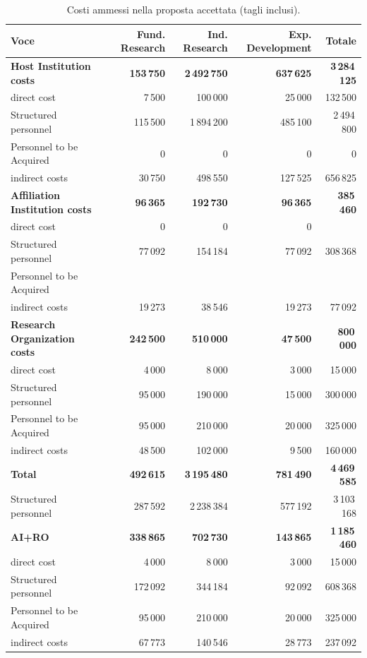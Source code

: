 \documentclass{plan4ari_report}
\begin{document}
\begin{table}[H]\centering\small
\caption{Costi ammessi nella proposta accettata (tagli inclusi).}\label{tab:acc-cost}
\begin{tabular}{lrrrr}\toprule
\textbf{Voce} & \textbf{Fund. Research} & \textbf{Ind. Research} & \textbf{Exp. Development} & \textbf{Totale} \\\midrule
\textbf{Host Institution costs} & \textbf{153\,750} & \textbf{2\,492\,750} & \textbf{637\,625} & \textbf{3\,284\,125} \\
\quad direct cost & 7\,500 & 100\,000 & 25\,000 & 132\,500 \\
\quad Structured personnel & 115\,500 & 1\,894\,200 & 485\,100 & 2\,494\,800 \\
\quad Personnel to be Acquired & 0 & 0 & 0 & 0 \\
\quad indirect costs & 30\,750 & 498\,550 & 127\,525 & 656\,825 \\
\textbf{Affiliation Institution costs} & \textbf{96\,365} & \textbf{192\,730} & \textbf{96\,365} & \textbf{385\,460} \\
\quad direct cost & 0 & 0 & 0 &  \\
\quad Structured personnel & 77\,092 & 154\,184 & 77\,092 & 308\,368 \\
\quad Personnel to be Acquired &  &  &  &  \\
\quad indirect costs & 19\,273 & 38\,546 & 19\,273 & 77\,092 \\
\textbf{Research Organization costs} & \textbf{242\,500} & \textbf{510\,000} & \textbf{47\,500} & \textbf{800\,000} \\
\quad direct cost & 4\,000 & 8\,000 & 3\,000 & 15\,000 \\
\quad Structured personnel & 95\,000 & 190\,000 & 15\,000 & 300\,000 \\
\quad Personnel to be Acquired & 95\,000 & 210\,000 & 20\,000 & 325\,000 \\
\quad indirect costs & 48\,500 & 102\,000 & 9\,500 & 160\,000 \\
\midrule
\textbf{Total} & \textbf{492\,615} & \textbf{3\,195\,480} & \textbf{781\,490} & \textbf{4\,469\,585} \\
\quad Structured personnel & 287\,592 & 2\,238\,384 & 577\,192 & 3\,103\,168 \\
\textbf{AI+RO} & \textbf{338\,865} & \textbf{702\,730} & \textbf{143\,865} & \textbf{1\,185\,460} \\
\quad direct cost & 4\,000 & 8\,000 & 3\,000 & 15\,000 \\
\quad Structured personnel & 172\,092 & 344\,184 & 92\,092 & 608\,368 \\
\quad Personnel to be Acquired & 95\,000 & 210\,000 & 20\,000 & 325\,000 \\
\quad indirect costs & 67\,773 & 140\,546 & 28\,773 & 237\,092 \\
\bottomrule\end{tabular}
\end{table}
\end{document}
